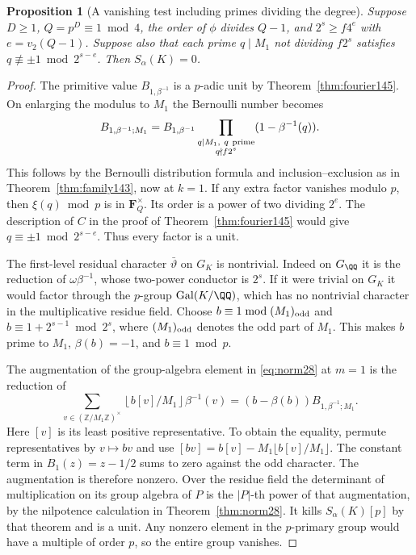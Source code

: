 \documentclass[a4paper,11pt]{article}
\newtheorem{proposition}{Proposition}[section]
\theoremstyle{definition}
\theoremstyle{remark}
\newcommand{\ZZ}{\mathbb Z}\newcommand{\ord}{\operatorname{ord}}
\numberwithin{equation}{section}
\begin{document}
\begin{proposition}[A vanishing test including primes dividing the degree]
\label{prop:effect146}
Suppose \(D\ge1\), \(Q=p^D\equiv1\bmod4\), the order of
\(\phi\) divides \(Q-1\), and \(2^s\ge f4^{e}\) with
\(e=v_2(Q-1)\). Suppose also that each prime \(q\mid M_1\)
not dividing \(f2^s\) satisfies \(q\not\equiv\pm1\bmod 2^{s-e}\).
Then \(S_\alpha(K)=0\).
\end{proposition}
\begin{proof}
The primitive value \(B_{1,\beta^{-1}}\) is a \(p\)-adic unit by
Theorem~\ref{thm:fourier145}. On enlarging the modulus to \(M_1\)
the Bernoulli number becomes
\[
 B_{1,\beta^{-1};M_1}
   =B_{1,\beta^{-1}}
       \prod_{\substack{q\mid M_1,\ q\ {\rm prime}\\q\nmid f2^s}}
                          (1-\beta^{-1}(q)).
\]
This follows by the Bernoulli distribution formula and
inclusion--exclusion as in Theorem~\ref{thm:family143}, now
at \(k=1\). If any extra factor vanishes modulo \(p\), then
\(\xi(q)\bmod p\) is in \(\mathbf F_Q^\times\). Its order is a
power of two dividing \(2^e\). The description of \(C\) in
the proof of Theorem~\ref{thm:fourier145} would give
\(q\equiv\pm1\bmod 2^{s-e}\). Thus every factor is a unit.

The first-level residual character \(\bar\vartheta\) on \(G_K\)
is nontrivial. Indeed on \(G_\QQ\) it is the reduction of
\(\omega\beta^{-1}\), whose two-power conductor is \(2^s\).
If it were trivial on \(G_K\) it would factor through the
\(p\)-group \(\operatorname{Gal}(K/\QQ)\), which has no
nontrivial character in the multiplicative residue field.
Choose \(b\equiv1\bmod (M_1)_{\rm odd}\) and
\(b\equiv1+2^{s-1}\bmod 2^s\), where \((M_1)_{\rm odd}\)
denotes the odd part of \(M_1\). This makes \(b\) prime to \(M_1\),
\(\beta(b)=-1\), and \(b\equiv1\bmod p\).

The augmentation of the group-algebra element in \eqref{eq:norm28}
at \(m=1\) is the reduction of
\[
 \sum_{v\in(\ZZ/M_1\ZZ)^\times}
            \left\lfloor b[v]/M_1\right\rfloor\beta^{-1}(v)
       =(b-\beta(b))B_{1,\beta^{-1};M_1}.
\]
Here \([v]\) is its least positive representative. To obtain
the equality, permute representatives by \(v\mapsto bv\) and
use \([bv]=b[v]-M_1\lfloor b[v]/M_1\rfloor\). The constant
term in \(B_1(z)=z-1/2\) sums to zero against the odd character.
The augmentation is therefore nonzero. Over the residue field
the determinant of multiplication on its group algebra of \(P\)
is the \(|P|\)-th power of that augmentation, by the nilpotence
calculation in Theorem~\ref{thm:norm28}. It kills \(S_\alpha(K)[p]\)
by that theorem and is a unit. Any nonzero element in the
\(p\)-primary group would have a multiple of order \(p\), so
the entire group vanishes.
\end{proof}
\end{document}
